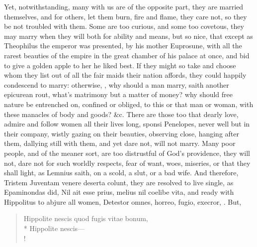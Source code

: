 Yet, notwithstanding, many with us are of the opposite part, they are
married themselves, and for others, let them burn, fire and flame, they
care not, so they be not troubled with them. Some are too curious, and
some too covetous, they may marry when they will both for ability and
means, but so nice, that except as Theophilus the emperor was
presented, by his mother Euprosune, with all the rarest beauties of the
empire in the great chamber of his palace at once, and bid to give a
golden apple to her he liked best. If they might so take and choose
whom they list out of all the fair maids their nation affords, they
could happily condescend to marry: otherwise, \etc{}, why should a man
marry, saith another epicurean rout, what's matrimony but a matter of
money? why should free nature be entrenched on, confined or obliged, to
this or that man or woman, with these manacles of body and goods? \&c.
There are those too that dearly love, admire and follow women all their
lives long, sponsi Penelopes, never well but in their company, wistly
gazing on their beauties, observing close, hanging after them, dallying
still with them, and yet dare not, will not marry. Many poor people,
and of the meaner sort, are too distrustful of God's providence, they
will not, dare not for such worldly respects, fear of want, woes,
miseries, or that they shall light, as Lemnius saith, on a scold,
a slut, or a bad wife. And therefore, Tristem Juventam venere
deserta colunt, they are resolved to live single, as Epaminondas
did, Nil ait esse prius, melius nil coelibe vita, and ready with
Hippolitus to abjure all women, Detestor omnes, horreo, fugio,
execror, \etc{}. But,

\begin{latin}
\begin{verse}%
Hippolite nescis quod fugis vitae bonum,\\*
Hippolite nescis---\\!
\end{verse}%
\end{latin}

